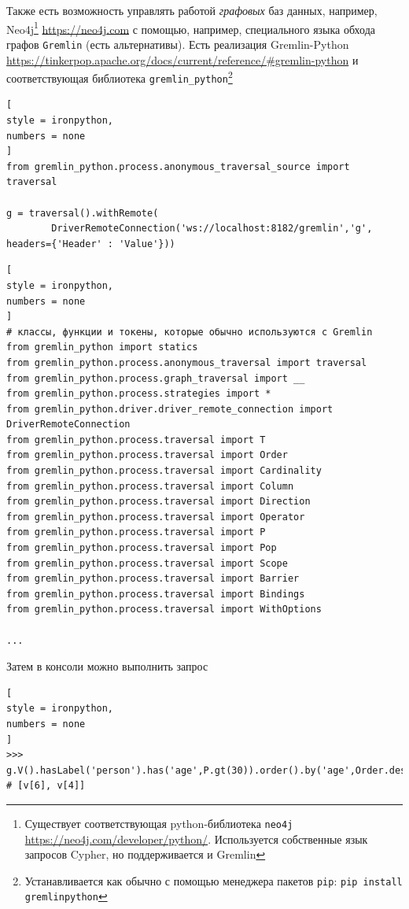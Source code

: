 \documentclass[%
	11pt,
	a4paper,
	utf8,
		]{article}
\begin{document}
Также есть возможность управлять работой \emph{графовых} баз данных, например, Neo4j\footnote{Существует соответствующая python-библиотека \texttt{neo4j} \url{https://neo4j.com/developer/python/}. Используется собственные язык запросов Cypher, но поддерживается и Gremlin} \url{https://neo4j.com} с помощью, например, специального языка обхода графов \texttt{Gremlin} (есть альтернативы). Есть реализация Gremlin-Python \url{https://tinkerpop.apache.org/docs/current/reference/#gremlin-python} и соответствующая библиотека \verb|gremlin_python|\footnote{Устанавливается как обычно с помощью менеджера пакетов \texttt{pip}: \texttt{pip install gremlinpython}}
\begin{lstlisting}[
style = ironpython,
numbers = none
]
from gremlin_python.process.anonymous_traversal_source import traversal

g = traversal().withRemote(
        DriverRemoteConnection('ws://localhost:8182/gremlin','g', headers={'Header' : 'Value'}))
\end{lstlisting}

\begin{lstlisting}[
style = ironpython,
numbers = none
]
# классы, функции и токены, которые обычно используются с Gremlin
from gremlin_python import statics
from gremlin_python.process.anonymous_traversal import traversal
from gremlin_python.process.graph_traversal import __
from gremlin_python.process.strategies import *
from gremlin_python.driver.driver_remote_connection import DriverRemoteConnection
from gremlin_python.process.traversal import T
from gremlin_python.process.traversal import Order
from gremlin_python.process.traversal import Cardinality
from gremlin_python.process.traversal import Column
from gremlin_python.process.traversal import Direction
from gremlin_python.process.traversal import Operator
from gremlin_python.process.traversal import P
from gremlin_python.process.traversal import Pop
from gremlin_python.process.traversal import Scope
from gremlin_python.process.traversal import Barrier
from gremlin_python.process.traversal import Bindings
from gremlin_python.process.traversal import WithOptions

...
\end{lstlisting}

Затем в консоли можно выполнить запрос
\begin{lstlisting}[
style = ironpython,
numbers = none
]
>>> g.V().hasLabel('person').has('age',P.gt(30)).order().by('age',Order.desc).toList()  # [v[6], v[4]]
\end{lstlisting}
\end{document}
